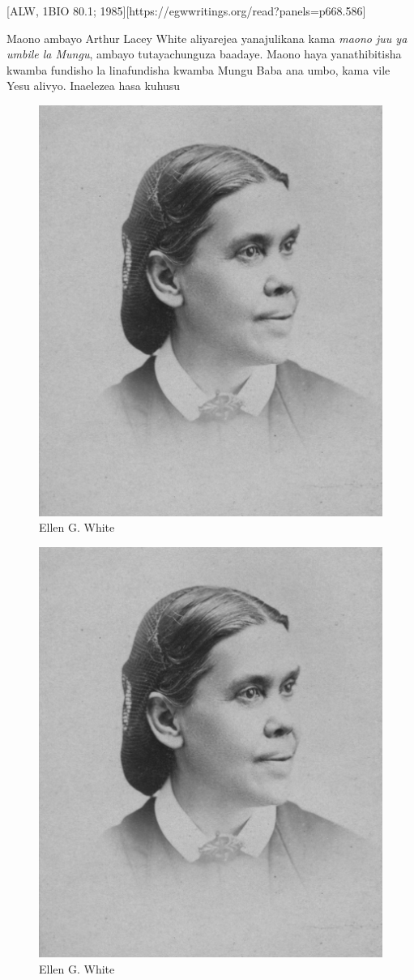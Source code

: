 [ALW, 1BIO 80.1; 1985][https://egwwritings.org/read?panels=p668.586]


Maono ambayo Arthur Lacey White aliyarejea yanajulikana kama \textit{maono juu ya umbile la Mungu}, ambayo tutayachunguza baadaye. Maono haya yanathibitisha kwamba fundisho la  linafundisha kwamba Mungu Baba ana umbo, kama vile Yesu alivyo. Inaelezea hasa kuhusu 


\begin{figure}[t]
    \centering
    \includegraphics[width=0.65\linewidth]{images/ellen-white.jpg}
    \caption*{Ellen G. White}
    \label{fig:ellen-g-white}
\end{figure}


\begin{figure}[t]
    \centering
    \includegraphics[width=0.65\linewidth]{images/ellen-white.jpg}
    \caption*{Ellen G. White}
    \label{fig:ellen-g-white}
\end{figure}

